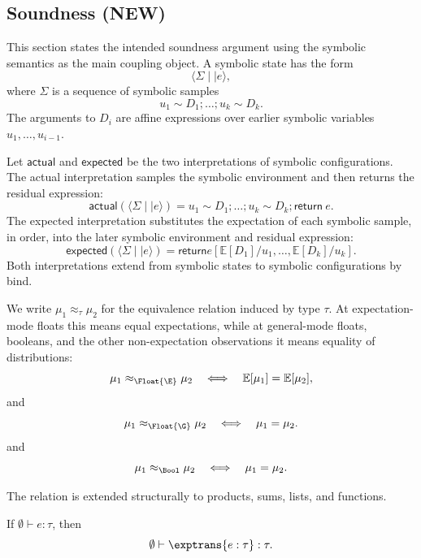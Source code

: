 







\subsection{Soundness (NEW)}

This section states the intended soundness argument using the symbolic
semantics as the main coupling object.  A symbolic state has the form
\[
  \langle \Sigma \mid\mid e \rangle,
\]
where \(\Sigma\) is a sequence of symbolic samples
\[
  u_1 \sim D_1;\ldots;u_k \sim D_k.
\]
The arguments to \(D_i\) are affine expressions over earlier symbolic variables
\(u_1,\ldots,u_{i-1}\).

Let \(\mathsf{actual}\) and \(\mathsf{expected}\) be the two interpretations of
symbolic configurations.  The actual interpretation samples the symbolic
environment and then returns the residual expression:
\[
  \mathsf{actual}(\langle \Sigma \mid\mid e \rangle)
  =
  u_1 \sim D_1;\ldots;u_k \sim D_k;\mathsf{return}\ e.
\]
The expected interpretation substitutes the expectation of each symbolic
sample, in order, into the later symbolic environment and residual expression:
\[
  \mathsf{expected}(\langle \Sigma \mid\mid e \rangle)
  =
  \mathsf{return}
  e[
    \mathbb{E}[D_1]/u_1,\ldots,
    \mathbb{E}[D_k]/u_k
  ].
\]
Both interpretations extend from symbolic states to symbolic configurations by
bind.

\begin{definition}
  We write \(\mu_1 \approx_\tau \mu_2\) for the equivalence relation induced by
  type \(\tau\).  At expectation-mode floats this means equal expectations,
  while at general-mode floats, booleans, and the other non-expectation
  observations it means equality of distributions:
  \[
    \mu_1 \approx_{\Float{\E}} \mu_2
    \quad\Longleftrightarrow\quad
    \mathbb{E}[\mu_1] = \mathbb{E}[\mu_2],
  \]
  and
  \[
    \mu_1 \approx_{\Float{\G}} \mu_2
    \quad\Longleftrightarrow\quad
    \mu_1 = \mu_2.
  \]
  and
  \[ 
    \mu_1 \approx_{\Bool} \mu_2
    \quad\Longleftrightarrow\quad
    \mu_1 = \mu_2.
  \]

  The relation is extended structurally to products, sums, lists, and
  functions.
\end{definition}

\begin{lemma}
  If \(\emptyset \vdash e : \tau\), then
  \[
    \emptyset \vdash \exptrans{e : \tau} : \tau.
  \]
\end{lemma}

